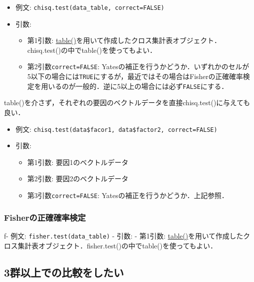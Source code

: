\documentclass[
  xelatex, ja=standard]{bxjsarticle}
\providecommand{\tightlist}{%
  \setlength{\itemsep}{0pt}\setlength{\parskip}{0pt}}
\begin{document}
\begin{itemize}
\tightlist
\item
  例文: \texttt{chisq.test(data\_table,\ correct=FALSE)}
\item
  引数:

  \begin{itemize}
  \tightlist
  \item
    第1引数:
    \hyperref[ux5ea6ux6570ux5206ux5e03ux3092ux6c42ux3081ux308b]{table()}を用いて作成したクロス集計表オブジェクト．chisq.test()の中でtable()を使ってもよい．
  \item
    第2引数\texttt{correct=FALSE}:
    Yatesの補正を行うかどうか．いずれかのセルが5以下の場合には\texttt{TRUE}にするが，最近ではその場合はFisherの正確確率検定を用いるのが一般的．逆に5以上の場合には必ず\texttt{FALSE}にする．
  \end{itemize}
\end{itemize}

table()を介さず，それぞれの要因のベクトルデータを直接chisq.test()に与えても良い．

\begin{itemize}
\tightlist
\item
  例文:
  \texttt{chisq.test(data\$facor1,\ data\$factor2,\ correct=FALSE)}
\item
  引数:

  \begin{itemize}
  \tightlist
  \item
    第1引数: 要因1のベクトルデータ
  \item
    第2引数: 要因2のベクトルデータ
  \item
    第3引数\texttt{correct=FALSE}: Yatesの補正を行うかどうか．上記参照．
  \end{itemize}
\end{itemize}

\subsubsection{Fisherの正確確率検定}\label{fisherux306eux6b63ux78baux78baux7387ux691cux5b9a}

f- 例文: \texttt{fisher.test(data\_table)} - 引数: - 第1引数:
\hyperref[ux5ea6ux6570ux5206ux5e03ux3092ux6c42ux3081ux308b]{table()}を用いて作成したクロス集計表オブジェクト．fisher.test()の中でtable()を使ってもよい．

\subsection{3群以上での比較をしたい}\label{ux7fa4ux4ee5ux4e0aux3067ux306eux6bd4ux8f03ux3092ux3057ux305fux3044}
\end{document}
